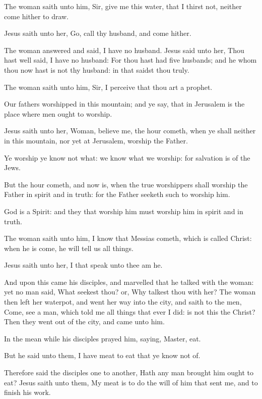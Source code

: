 \verse The woman saith unto him, Sir, give me this water, that I thirst not, neither come hither to draw.

\verse Jesus saith unto her, Go, call thy husband, and come hither.

\verse The woman answered and said, I have no husband. Jesus said unto her, Thou hast well said, I have no husband: \verse For thou hast had five husbands; and he whom thou now hast is not thy husband: in that saidst thou truly.

\verse The woman saith unto him, Sir, I perceive that thou art a prophet.

\verse Our fathers worshipped in this mountain; and ye say, that in Jerusalem is the place where men ought to worship.

\verse Jesus saith unto her, Woman, believe me, the hour cometh, when ye shall neither in this mountain, nor yet at Jerusalem, worship the Father.

\verse Ye worship ye know not what: we know what we worship: for salvation is of the Jews.

\verse But the hour cometh, and now is, when the true worshippers shall worship the Father in spirit and in truth: for the Father seeketh such to worship him.

\verse God is a Spirit: and they that worship him must worship him in spirit and in truth.

\verse The woman saith unto him, I know that Messias cometh, which is called Christ: when he is come, he will tell us all things.

\verse Jesus saith unto her, I that speak unto thee am he.

\verse And upon this came his disciples, and marvelled that he talked with the woman: yet no man said, What seekest thou? or, Why talkest thou with her?  \verse The woman then left her waterpot, and went her way into the city, and saith to the men, \verse Come, see a man, which told me all things that ever I did: is not this the Christ?  \verse Then they went out of the city, and came unto him.

\verse In the mean while his disciples prayed him, saying, Master, eat.

\verse But he said unto them, I have meat to eat that ye know not of.

\verse Therefore said the disciples one to another, Hath any man brought him ought to eat?  \verse Jesus saith unto them, My meat is to do the will of him that sent me, and to finish his work.

